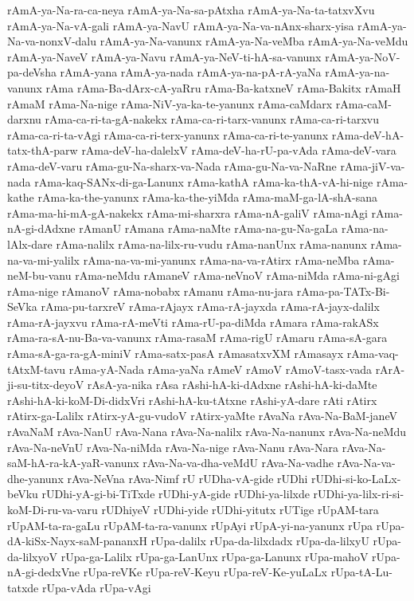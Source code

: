 {rAmA-ya-Na-ra-ca-neya
rAmA-ya-Na-sa-pAtxha
rAmA-ya-Na-ta-tatxvXvu
rAmA-ya-Na-vA-gali
rAmA-ya-NavU
rAmA-ya-Na-va-nAnx-sharx-yisa
rAmA-ya-Na-va-nonxV-dalu
rAmA-ya-Na-vanunx
rAmA-ya-Na-veMba
rAmA-ya-Na-veMdu
rAmA-ya-NaveV
rAmA-ya-Navu
rAmA-ya-NeV-ti-hA-sa-vanunx
rAmA-ya-NoV-pa-deVsha
rAmA-yana
rAmA-ya-nada
rAmA-ya-na-pA-rA-yaNa
rAmA-ya-na-vanunx
rAma
rAma-Ba-dArx-cA-yaRru
rAma-Ba-katxneV
rAma-Bakitx
rAmaH
rAmaM
rAma-Na-nige
rAma-NiV-ya-ka-te-yanunx
rAma-caMdarx
rAma-caM-darxnu
rAma-ca-ri-ta-gA-nakekx
rAma-ca-ri-tarx-vanunx
rAma-ca-ri-tarxvu
rAma-ca-ri-ta-vAgi
rAma-ca-ri-terx-yanunx
rAma-ca-ri-te-yanunx
rAma-deV-hA-tatx-thA-parw
rAma-deV-ha-dalelxV
rAma-deV-ha-rU-pa-vAda
rAma-deV-vara
rAma-deV-varu
rAma-gu-Na-sharx-va-Nada
rAma-gu-Na-va-NaRne
rAma-jiV-va-nada
rAma-kaq-SANx-di-ga-Lanunx
rAma-kathA
rAma-ka-thA-vA-hi-nige
rAma-kathe
rAma-ka-the-yanunx
rAma-ka-the-yiMda
rAma-maM-ga-lA-shA-sana
rAma-ma-hi-mA-gA-nakekx
rAma-mi-sharxra
rAma-nA-galiV
rAma-nAgi
rAma-nA-gi-dAdxne
rAmanU
rAmana
rAma-naMte
rAma-na-gu-Na-gaLa
rAma-na-lAlx-dare
rAma-nalilx
rAma-na-lilx-ru-vudu
rAma-nanUnx
rAma-nanunx
rAma-na-va-mi-yalilx
rAma-na-va-mi-yanunx
rAma-na-va-rAtirx
rAma-neMba
rAma-neM-bu-vanu
rAma-neMdu
rAmaneV
rAma-neVnoV
rAma-niMda
rAma-ni-gAgi
rAma-nige
rAmanoV
rAma-nobabx
rAmanu
rAma-nu-jara
rAma-pa-TATx-Bi-SeVka
rAma-pu-tarxreV
rAma-rAjayx
rAma-rA-jayxda
rAma-rA-jayx-dalilx
rAma-rA-jayxvu
rAma-rA-meVti
rAma-rU-pa-diMda
rAmara
rAma-rakASx
rAma-ra-sA-nu-Ba-va-vanunx
rAma-rasaM
rAma-rigU
rAmaru
rAma-sA-gara
rAma-sA-ga-ra-gA-miniV
rAma-satx-pasA
rAmasatxvXM
rAmasayx
rAma-vaq-tAtxM-tavu
rAma-yA-Nada
rAma-yaNa
rAmeV
rAmoV
rAmoV-tasx-vada
rArA-ji-su-titx-deyoV
rAsA-ya-nika
rAsa
rAshi-hA-ki-dAdxne
rAshi-hA-ki-daMte
rAshi-hA-ki-koM-Di-didxVri
rAshi-hA-ku-tAtxne
rAshi-yA-dare
rAti
rAtirx
rAtirx-ga-Lalilx
rAtirx-yA-gu-vudoV
rAtirx-yaMte
rAvaNa
rAva-Na-BaM-janeV
rAvaNaM
rAva-NanU
rAva-Nana
rAva-Na-nalilx
rAva-Na-nanunx
rAva-Na-neMdu
rAva-Na-neVnU
rAva-Na-niMda
rAva-Na-nige
rAva-Nanu
rAva-Nara
rAva-Na-saM-hA-ra-kA-yaR-vanunx
rAva-Na-va-dha-veMdU
rAva-Na-vadhe
rAva-Na-va-dhe-yanunx
rAva-NeVna
rAva-Nimf
rU
rUDha-vA-gide
rUDhi
rUDhi-si-ko-LaLx-beVku
rUDhi-yA-gi-bi-TiTxde
rUDhi-yA-gide
rUDhi-ya-lilxde
rUDhi-ya-lilx-ri-si-koM-Di-ru-va-varu
rUDhiyeV
rUDhi-yide
rUDhi-yitutx
rUTige
rUpAM-tara
rUpAM-ta-ra-gaLu
rUpAM-ta-ra-vanunx
rUpAyi
rUpA-yi-na-yanunx
rUpa
rUpa-dA-kiSx-Nayx-saM-pananxH
rUpa-dalilx
rUpa-da-lilxdadx
rUpa-da-lilxyU
rUpa-da-lilxyoV
rUpa-ga-Lalilx
rUpa-ga-LanUnx
rUpa-ga-Lanunx
rUpa-mahoV
rUpa-nA-gi-dedxVne
rUpa-reVKe
rUpa-reV-Keyu
rUpa-reV-Ke-yuLaLx
rUpa-tA-Lu-tatxde
rUpa-vAda
rUpa-vAgi
}
